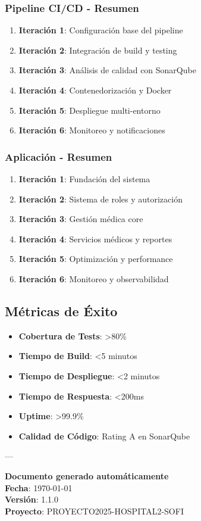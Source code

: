 \documentclass[12pt,a4paper]{article}
\begin{document}
\subsubsection{Pipeline CI/CD - Resumen}
\begin{enumerate}
    \item \textbf{Iteración 1}: Configuración base del pipeline
    \item \textbf{Iteración 2}: Integración de build y testing
    \item \textbf{Iteración 3}: Análisis de calidad con SonarQube
    \item \textbf{Iteración 4}: Contenedorización y Docker
    \item \textbf{Iteración 5}: Despliegue multi-entorno
    \item \textbf{Iteración 6}: Monitoreo y notificaciones
\end{enumerate}

\subsubsection{Aplicación - Resumen}
\begin{enumerate}
    \item \textbf{Iteración 1}: Fundación del sistema
    \item \textbf{Iteración 2}: Sistema de roles y autorización
    \item \textbf{Iteración 3}: Gestión médica core
    \item \textbf{Iteración 4}: Servicios médicos y reportes
    \item \textbf{Iteración 5}: Optimización y performance
    \item \textbf{Iteración 6}: Monitoreo y observabilidad
\end{enumerate}

\subsection{Métricas de Éxito}
\begin{itemize}
    \item \textbf{Cobertura de Tests}: >80\%
    \item \textbf{Tiempo de Build}: <5 minutos
    \item \textbf{Tiempo de Despliegue}: <2 minutos
    \item \textbf{Tiempo de Respuesta}: <200ms
    \item \textbf{Uptime}: >99.9\%
    \item \textbf{Calidad de Código}: Rating A en SonarQube
\end{itemize}

---

\textbf{Documento generado automáticamente} \\
\textbf{Fecha}: \today \\
\textbf{Versión}: 1.1.0 \\
\textbf{Proyecto}: PROYECTO2025-HOSPITAL2-SOFI
\end{document}
